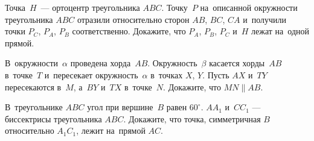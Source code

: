 


\begin{problems}

\item
Точка~$H$~--- ортоцентр треугольника $ABC$.
Точку~$P$ на~описанной окружности треугольника $ABC$ отразили относительно
сторон $AB$, $BC$, $CA$ и~получили точки $P_C$, $P_A$, $P_B$ соответственно.
Докажите, что $P_A$, $P_B$, $P_C$ и~$H$ лежат на~одной прямой.

\item
В~окружности~$\alpha$ проведена хорда~$AB$.
Окружность~$\beta$ касается хорды~$AB$ в~точке~$T$ и~пересекает
окружность~$\alpha$ в~точках $X$, $Y$.
Пусть $AX$ и~$TY$ пересекаются в~$M$, а~$BY$ и~$TX$ в~точке~$N$.
Докажите, что $MN \parallel AB$.

\item
В~треугольнике $ABC$ угол при вершине~$B$ равен $60^{\circ}$.
$A A_1$ и~$C C_1$ — биссектрисы треугольника $ABC$.
Докажите, что точка, симметричная $B$ относительно $A_1 C_1$, лежит
на~прямой $AC$.

\end{problems}

